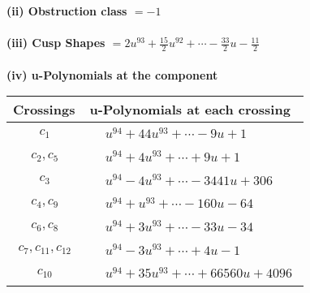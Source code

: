 \documentclass[1p]{elsarticle_modified}
\theoremstyle{definition}
\begin{document}
\flushleft \textbf{(ii) Obstruction class $= -1$}\\~\\
\flushleft \textbf{(iii) Cusp Shapes $= 2 u^{93}+\frac{15}{2} u^{92}+\cdots-\frac{33}{2} u-\frac{11}{2}$}\\~\\
\newpage\renewcommand{\arraystretch}{1}
\flushleft \textbf{(iv) u-Polynomials at the component}\newline \\
\begin{tabular}{m{50pt}|m{274pt}}
Crossings & \hspace{64pt}u-Polynomials at each crossing \\
\hline $$\begin{aligned}c_{1}\end{aligned}$$&$\begin{aligned}
&u^{94}+44 u^{93}+\cdots-9 u+1
\end{aligned}$\\
\hline $$\begin{aligned}c_{2},c_{5}\end{aligned}$$&$\begin{aligned}
&u^{94}+4 u^{93}+\cdots+9 u+1
\end{aligned}$\\
\hline $$\begin{aligned}c_{3}\end{aligned}$$&$\begin{aligned}
&u^{94}-4 u^{93}+\cdots-3441 u+306
\end{aligned}$\\
\hline $$\begin{aligned}c_{4},c_{9}\end{aligned}$$&$\begin{aligned}
&u^{94}+u^{93}+\cdots-160 u-64
\end{aligned}$\\
\hline $$\begin{aligned}c_{6},c_{8}\end{aligned}$$&$\begin{aligned}
&u^{94}+3 u^{93}+\cdots-33 u-34
\end{aligned}$\\
\hline $$\begin{aligned}c_{7},c_{11},c_{12}\end{aligned}$$&$\begin{aligned}
&u^{94}-3 u^{93}+\cdots+4 u-1
\end{aligned}$\\
\hline $$\begin{aligned}c_{10}\end{aligned}$$&$\begin{aligned}
&u^{94}+35 u^{93}+\cdots+66560 u+4096
\end{aligned}$\\
\hline
\end{tabular}\\~\\
\end{document}
